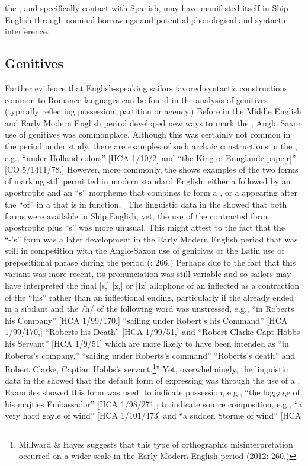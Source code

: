 the , and specifically contact with Spanish, may have manifested itself in Ship English through nominal borrowings and potential phonological and syntactic interference. ~

\subsection{{Genitives}}%

Further evidence that English-speaking sailors favored syntactic constructions common to Romance languages can be found in the analysis of genitives (typically reflecting possession, partition or agency.) Before  in the Middle English and Early Modern English period developed new ways to mark the , Anglo Saxon use of  genitives was commonplace. Although this was certainly not common in the period under study, there are examples of such archaic constructions in the , e.g., “under Holland colors” [HCA 1/10/2] and “the King of Ennglande pape[r]” [CO 5/1411/78.] However, more commonly, the  shows examples of the two forms of  marking still permitted in modern standard English: either a  followed by an apostrophe and an “s” morpheme that combines to form a  , or a  appearing after the  “of” in a  that is  in function. ~The linguistic data in the  showed that both forms were available in Ship English, yet, the use of the contracted form apostrophe plus “s” was more unusual. This might attest to the fact that the “-’s”  form was a later development in the Early Modern English period that was still in competition with the Anglo-Saxon use of  genitives or the Latin use of prepositional  phrase during the period (\citealt{Milward1996}: 266.) Perhaps due to the fact that this variant was more recent, its pronunciation was still variable and so sailors may have interpreted the final [s,] [z,] or [Iz] allophone of an inflected   as a contraction of the   “his” rather than an inflectional ending, particularly if the  already ended in a sibilant and the /h/ of the following word was unstressed, e.g., “in Roberts his Company” [HCA 1/99/170,] “sailing under Robert’s his Command” [HCA 1/99/170,] “Roberts his Death” [HCA 1/99/51,] and “Robert Clarke Capt Hobbs his Servant” [HCA 1/9/51] which are more likely to have been intended as “in Roberts’s company,” “sailing under Roberts’s command” “Roberts’s death” and Robert Clarke, Captian Hobbs’s servant.\footnote{Millward \& Hayes suggests that this type of orthographic misinterpretation occurred on a wider scale in the Early Modern English period (2012: 260.)}” Yet, overwhelmingly, the linguistic data in the  showed that the default form of expressing  was through the use of a . Examples showed this form was used: to indicate possession, e.g., “the luggage of his majties Embassador” [HCA 1/98/271]; to indicate source composition, e.g., “a very hard gayle of wind” [HCA 1/101/473] and “a sudden Storme of wind” [HCA 